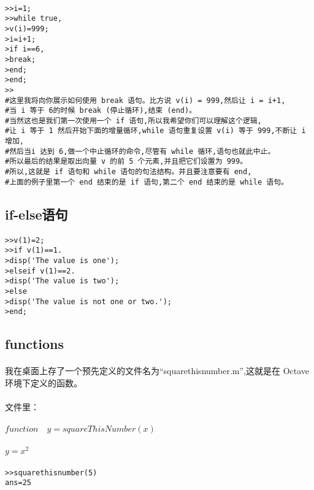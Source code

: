 \documentclass{article}
\begin{document}
\begin{CJK}{UTF8}{gbsn}
\paragraph{}
\begin{verbatim}
>>i=1;
>>while true,
>v(i)=999;
>i=i+1;
>if i==6,
>break;
>end;
>end;
>>
#这里我将向你展示如何使用 break 语句。比方说 v(i) = 999,然后让 i = i+1,
#当 i 等于 6的时候 break (停止循环),结束 (end)。
#当然这也是我们第一次使用一个 if 语句,所以我希望你们可以理解这个逻辑,
#让 i 等于 1 然后开始下面的增量循环,while 语句重复设置 v(i) 等于 999,不断让 i 增加,
#然后当i 达到 6,做一个中止循环的命令,尽管有 while 循环,语句也就此中止。
#所以最后的结果是取出向量 v 的前 5 个元素,并且把它们设置为 999。
#所以,这就是 if 语句和 while 语句的句法结构。并且要注意要有 end,
#上面的例子里第一个 end 结束的是 if 语句,第二个 end 结束的是 while 语句。
\end{verbatim}
\subsection{if-else语句}
\paragraph{}
\begin{verbatim}
>>v(1)=2;
>>if v(1)==1.
>disp('The value is one');
>elseif v(1)==2.
>disp('The value is two');
>else
>disp('The value is not one or two.');
>end;
\end{verbatim}
\subsection{functions}
\paragraph{}
我在桌面上存了一个预先定义的文件名为“squarethisnumber.m”,这就是在 Octave 环境下定义的函数。
\paragraph{}
文件里：
\paragraph{}
$function \quad y=squareThisNumber(x)$
\paragraph{}
$y=x^2$
\paragraph{}
\begin{verbatim}
>>squarethisnumber(5)
ans=25
\end{verbatim}

\end{CJK}
\end{document}

